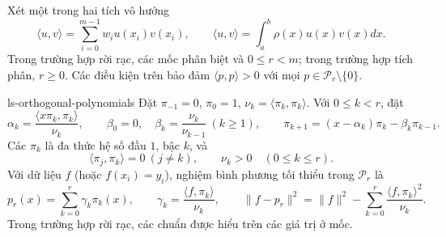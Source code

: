 \documentclass[12pt,a4paper,oneside]{book}
\numberwithin{algorithm}{chapter}
\theoremstyle{definition}
\begin{document}
Xét một trong hai tích vô hướng
\[
 \langle u,v\rangle=\sum_{i=0}^{m-1}w_iu(x_i)v(x_i),\qquad
 \langle u,v\rangle=\int_a^b\rho(x)u(x)v(x)dx.
\]
Trong trường hợp rời rạc, các mốc phân biệt và $0\leq r<m$; trong trường hợp tích phân, $r\geq0$. Các điều kiện trên bảo đảm $\langle p,p\rangle>0$ với mọi $p\in\mathcal P_r\setminus\{0\}$.
\begin{dinhly}{}{ls-orthogonal-polynomials}
Đặt $\pi_{-1}=0$, $\pi_0=1$, $\nu_k=\langle\pi_k,\pi_k\rangle$. Với $0\leq k<r$, đặt
\begin{equation}\label{eq:ls-orthogonal-recurrence}
 \alpha_k=\frac{\langle x\pi_k,\pi_k\rangle}{\nu_k},\qquad
 \beta_0=0,\quad\beta_k=\frac{\nu_k}{\nu_{k-1}}\ (k\geq1),\qquad
 \pi_{k+1}=(x-\alpha_k)\pi_k-\beta_k\pi_{k-1}.
\end{equation}
Các $\pi_k$ là đa thức hệ số đầu $1$, bậc $k$, và
\[
 \langle\pi_j,\pi_k\rangle=0\ (j\ne k),\qquad\nu_k>0\quad(0\leq k\leq r).
\]
Với dữ liệu $f$ (hoặc $f(x_i)=y_i$), nghiệm bình phương tối thiểu trong $\mathcal P_r$ là
\begin{equation}\label{eq:ls-orthogonal-projection}
 p_r(x)=\sum_{k=0}^r\gamma_k\pi_k(x),\qquad
 \gamma_k=\frac{\langle f,\pi_k\rangle}{\nu_k},\qquad
 \|f-p_r\|^2=\|f\|^2-\sum_{k=0}^r\frac{\langle f,\pi_k\rangle^2}{\nu_k}.
\end{equation}
Trong trường hợp rời rạc, các chuẩn được hiểu trên các giá trị ở mốc.
\end{dinhly}
\end{document}
